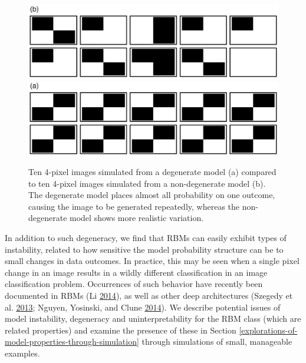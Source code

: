 \documentclass[]{article}
\theoremstyle{definition}
\begin{document}
\par
\begin{figure}
\includegraphics[width=1\linewidth]{paper_files/figure-latex/sample-models-1} \includegraphics[width=1\linewidth]{paper_files/figure-latex/sample-models-2} \caption{Ten 4-pixel images simulated from a degenerate model (a) compared to ten 4-pixel images simulated from a non-degenerate model (b). The degenerate model places almost all probability on one outcome, causing the image to be generated repeatedly, whereas the non-degenerate model shows more realistic variation.}\label{fig:sample-models}
\end{figure}
In addition to such degeneracy, we find that RBMs can easily exhibit
types of instability, related to how sensitive the model probability
structure can be to small changes in data outcomes. In practice, this
may be seen when a single pixel change in an image results in a wildly
different classification in an image classification problem. Occurrences
of such behavior have recently been documented in RBMs (Li
\protect\hyperlink{ref-li2014biclustering}{2014}), as well as other deep
architectures (Szegedy et al.
\protect\hyperlink{ref-szegedy2013intriguing}{2013}; Nguyen, Yosinski,
and Clune \protect\hyperlink{ref-nguyen2014deep}{2014}). We describe
potential issues of model instability, degeneracy and uninterpretability
for the RBM class (which are related properties) and examine the
presence of these in Section
\ref{explorations-of-model-properties-through-simulation} through
simulations of small, manageable examples.
\end{document}
